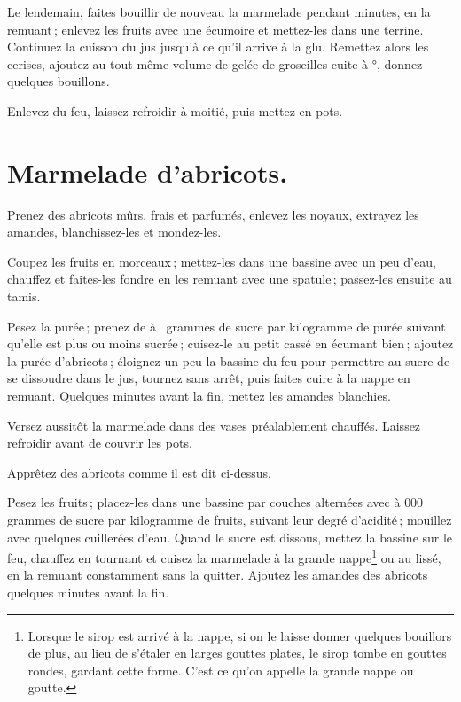 Le lendemain, faites bouillir de nouveau la marmelade pendant {\mmm}
minutes, en la remuant ; enlevez les fruits avec une écumoire et mettez-les
dans une terrine. Continuez la cuisson du jus jusqu'à ce qu'il arrive à la glu.
Remettez alors les cerises, ajoutez au tout même volume de gelée de groseilles
cuite à {\mmm}°, donnez quelques bouillons.

Enlevez du feu, laissez refroidir à moitié, puis mettez en pots.

\section*{\centering Marmelade d’abricots.}
{}

Prenez des abricots mûrs, frais et parfumés, enlevez les noyaux, extrayez les
amandes, blanchissez-les et mondez-les.

Coupez les fruits en morceaux ; mettez-les dans une bassine avec un peu d'eau,
chauffez et faites-les fondre en les remuant avec une spatule ; passez-les
ensuite au tamis.

Pesez la purée ; prenez de {\mmm} à {\mmm} {\mmm} grammes de
sucre par kilogramme de purée suivant qu'elle est plus ou moins sucrée ;
cuisez-le au petit cassé en écumant bien ; ajoutez la purée d’abricots ;
éloignez un peu la bassine du feu pour permettre au sucre de se dissoudre dans
le jus, tournez sans arrêt, puis faites cuire à la nappe en remuant. Quelques
minutes avant la fin, mettez les amandes blanchies.

Versez aussitôt la marmelade dans des vases préalablement chauffés. Laissez
refroidir avant de couvrir les pots.

\sk

Apprêtez des abricots comme il est dit ci-dessus.

Pesez les fruits ; placez-les dans une bassine par couches alternées avec
{\mmm} à { 000\mmm} grammes de sucre par kilogramme de fruits,
suivant leur degré d'acidité ; mouillez avec quelques cuillerées d'eau. Quand
le sucre est dissous, mettez la bassine sur le feu, chauffez en tournant et
cuisez la marmelade à la grande nappe\footnote{
Lorsque le sirop est arrivé à la nappe, si on le laisse donner quelques
bouillors de plus, au lieu de s'étaler en larges gouttes plates, le sirop tombe
en gouttes rondes, gardant cette forme. C'est ce qu'on appelle la grande nappe
ou goutte.} ou au lissé, en la remuant constamment sans la quitter. Ajoutez les
amandes des abricots quelques minutes avant la fin.

